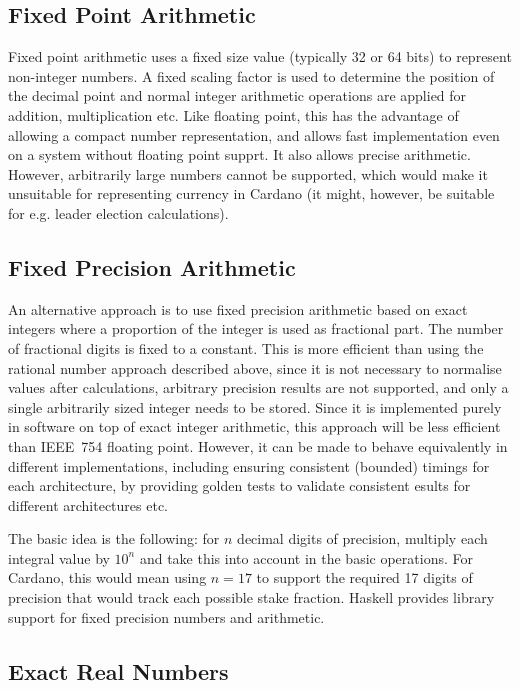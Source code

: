 \documentclass[11pt,a4paper,dvipsnames,twosided]{article}
\theoremstyle{definition}
\theoremstyle{definition}
\begin{document}
\subsection{Fixed Point Arithmetic}

Fixed point arithmetic uses a fixed size value (typically 32 or 64 bits) to
represent non-integer numbers.  A fixed scaling factor is used to determine the
position of the decimal point and normal integer arithmetic operations are
applied for addition, multiplication etc.  Like floating point, this has the
advantage of allowing a compact number representation, and allows fast implementation even on
a system without floating point supprt.  It also allows precise arithmetic.  However,
arbitrarily large numbers cannot be supported, which would make it unsuitable for
representing currency in Cardano (it might, however, be suitable for e.g. leader election calculations).


\subsection{Fixed Precision Arithmetic}
\label{sec:fixed-point-arithm}

An alternative approach is to use fixed precision arithmetic based on exact
integers where a proportion of the integer is used as fractional part.  The
number of fractional digits is fixed to a constant.  This is more efficient than
using the rational number approach described above, since it is not necessary to
normalise values after calculations, arbitrary precision results are not
supported, and only a single arbitrarily sized integer needs to be stored.
Since it is implemented purely in software on top of exact integer arithmetic,
this approach will be less efficient than IEEE~754 floating point.  However, it
can be made to behave equivalently in different implementations, including
ensuring consistent (bounded) timings for each architecture, by providing golden
tests to validate consistent esults for different architectures etc.

The basic idea is the following: for $n$ decimal digits of precision, multiply
each integral value by $10^{n}$ and take this into account in the basic
operations. For Cardano, this would mean using $n=17$ to support the required 17
digits of precision that would track each possible stake fraction.  Haskell
provides library support for fixed precision numbers and arithmetic.

\subsection{Exact Real Numbers}
\end{document}
